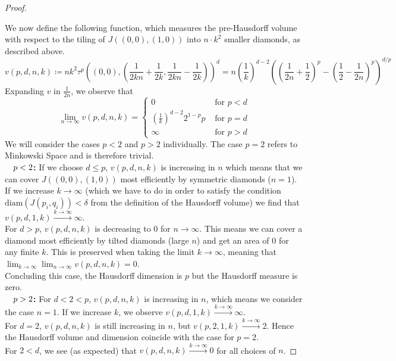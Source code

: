 \documentclass[11pt, a4paper]{article} %
\theoremstyle{plain} %
\newcommand{\mDef}{\coloneqq }
\begin{document}
\begin{proof}
\begin{center}
    \end{center}
    We now define the following function, which measures the pre-Hausdorff volume with respect to the tiling of \( J((0,0),(1,0)) \) into \( n \cdot k^2 \) smaller diamonds, as described above.
\begin{equation*}
    v(p,d,n,k) \mDef  n k^2 \tau^p((0,0),(\frac{1}{2kn}+\frac{1}{2k},\frac{1}{2kn}-\frac{1}{2k}))^d
    =  n \left(\frac{1}{k}\right)^{d-2} \left(\left(\frac{1}{2 n}+\frac{1}{2}\right)^p-\left(\frac{1}{2}-\frac{1}{2 n}\right)^p\right)^{d/p}
\end{equation*}
Expanding $v$ in $\frac{1}{2 n}$, we observe that 
\begin{equation*}
    \lim_{n\to \infty} v(p,d,n,k) = \begin{cases}
        0 & \text{ for }p<d\\
        \left(\frac{1}{k}\right)^{d-2} 2^{1-p} p & \text{ for }p=d\\
        \infty & \text{ for }p>d
    \end{cases}
\end{equation*}
 We will consider the cases $p<2$ and $p>2$ individually. The case $p=2$ refers to Minkowski Space and is therefore trivial.\\
 \textbf{$\null\quad p<2$: } If we choose $d\leq p$, $v(p,d,n,k)$ is increasing in $n$ which means that we can cover $J((0,0),(1,0))$ most efficiently by symmetric diamonds ($n=1$).
 If we increase $k\to \infty$ (which we have to do in order to satisfy the condition $\text{diam}(J(p_i,q_i)) < \delta$ from the definition of the Hausdorff volume) we find that $v(p,d,1,k) \xrightarrow{k\to\infty} \infty$.\\
 For $d>p$, $v(p,d,n,k)$ is decreasing to $0$ for $n\to\infty$. This means we can cover a diamond most efficiently by tilted diamonds (large $n$) and get an area of $0$ for any finite $k$. This is preserved when taking the limit $k\to \infty$, meaning that $\lim_{k\to\infty}\lim_{n\to \infty}v(p,d,n,k) = 0$.\\
 Concluding this case, the Hausdorff dimension is $p$ but the Hausdorff measure is zero.\\
  \textbf{$\null\quad p>2$: } 
  For $d<2<p$, $v(p,d,n,k)$ is increasing in $n$, which means we consider the case $n=1$. If we increase $k$, we observe $v(p,d,1,k)\xrightarrow{k\to\infty} \infty$.\\
  For $d=2$, $v(p,d,n,k)$ is still increasing in $n$, but $v(p,2,1,k)\xrightarrow{k\to\infty} 2$. Hence the Hausdorff volume and dimension coincide with the case for $p=2$.\\
  For $2<d$, we see (as expected) that $v(p,d,n,k)\xrightarrow{k\to\infty} 0$ for all choices of $n$.
\end{proof}
\end{document}
